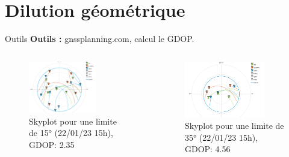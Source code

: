 \documentclass[xcolor=dvipsnames,envcountsect]{beamer}
\begin{document}
\section{Dilution géométrique}
\begin{frame}{Outils}
	\centering
	\textbf{Outils :} gnssplanning.com, calcul le GDOP.
	\newline
	\begin{columns}
		\begin{column}{0.5\textwidth}
			\begin{figure}
				\centering
				\includegraphics[width=0.7\textwidth]{./Figures/gdop15.png}
				\caption{Skyplot pour une limite de 15° (22/01/23 15h), GDOP: 2.35}	
			\end{figure}
		\end{column}

		\begin{column}{0.5\textwidth}
			\begin{figure}
				\centering
				\includegraphics[width=0.8\textwidth]{./Figures/gdop35.png}
				\caption{Skyplot pour une limite de 35° (22/01/23 15h), GDOP: 4.56}	
			\end{figure}
		\end{column}
	\end{columns}
\end{frame}
\end{document}

